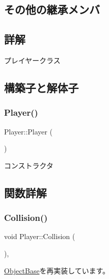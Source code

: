 \subsection*{その他の継承メンバ}


\subsection{詳解}
プレイヤークラス 

\subsection{構築子と解体子}
\mbox{\label{class_player_affe0cc3cb714f6deb4e62f0c0d3f1fd8}} 
\subsubsection{\texorpdfstring{Player()}{Player()}}
{\footnotesize\ttfamily Player\+::\+Player (\begin{DoxyParamCaption}{ }\end{DoxyParamCaption})\hspace{0.3cm}{\ttfamily [inline]}}



コンストラクタ 



\subsection{関数詳解}
\mbox{\label{class_player_a660421b69afc7cd6d0d97ea9a28251a2}} 
\subsubsection{\texorpdfstring{Collision()}{Collision()}}
{\footnotesize\ttfamily void Player\+::\+Collision (\begin{DoxyParamCaption}\item[{\mbox{\hyperlink{class_object_base}{Object\+Base}} $\ast$}]{ }\end{DoxyParamCaption})\hspace{0.3cm}{\ttfamily [inline]}, {\ttfamily [virtual]}}



\mbox{\hyperlink{class_object_base_a1991d1c2c214a593feb6b6b24802a8c4}{Object\+Base}}を再実装しています。

